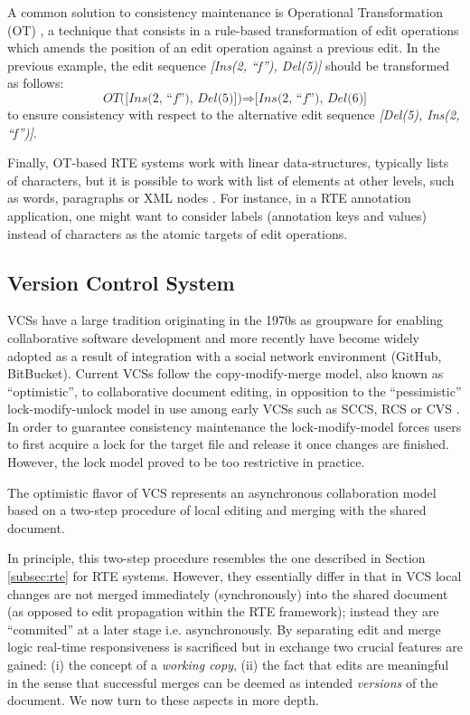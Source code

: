 \documentclass{sig-alternate}
\begin{document}
A common solution to consistency maintenance is Operational Transformation
(OT) \cite{SuClarence}, a technique that consists in a rule-based transformation
of edit operations which amends the position of an edit operation against a previous edit.
In the previous example, the edit sequence \textit{[Ins(2, ``f''), Del(5)]} should be
transformed as follows:
\begin{equation*}
  \textit{OT([Ins(2, ``f''), Del(5)])} \Rightarrow \textit{[Ins(2, ``f''), Del(6)]}
\end{equation*}
to ensure consistency with respect to the alternative edit sequence
\textit{[Del(5), Ins(2, ``f'')]}.


Finally, OT-based RTE systems work with linear data-structures, typically lists of
characters, but it is possible to work with list of elements at other levels, such as words,
paragraphs or XML nodes \cite{Imine2009,SuClarence}. For instance, in a RTE annotation application,
one might want to consider labels (annotation keys and values) instead of characters as the
atomic targets of edit operations.


\subsection{Version Control System}\label{subsec:vcs}

VCSs have a large tradition originating in the 1970s as groupware for enabling collaborative
software development and more recently have become widely adopted as a result of
integration with a social network environment (GitHub, BitBucket).
Current VCSs follow the copy-modify-merge model, also known as ``optimistic'', to
collaborative document editing, in opposition to the ``pessimistic'' lock-modify-unlock model
in use among early VCSs such as SCCS, RCS or CVS \cite{Loeliger2012}.
In order to guarantee consistency maintenance the lock-modify-model forces users to first
acquire a lock for the target file and release it once changes are finished. However, 
the lock model proved to be too restrictive in practice.

The optimistic flavor of VCS represents an asynchronous collaboration model based on a
two-step procedure of local editing and merging with the shared document.

In principle, this two-step procedure resembles the one described in Section \ref{subsec:rte}
for RTE systems. However, they essentially differ in that in VCS local changes are not merged
immediately (synchronously) into the shared document (as opposed to edit propagation
within the RTE framework); instead they are ``commited'' at a later stage
\textemdash i.e. asynchronously.
By separating edit and merge logic real-time responsiveness is
sacrificed but in exchange two crucial features are gained: (i) the concept of a
\textit{working copy}, (ii) the fact that edits are meaningful \textemdash in the sense
that successful merges can be deemed as intended \textit{versions} of the document.
We now turn to these aspects in more depth.
\end{document}
